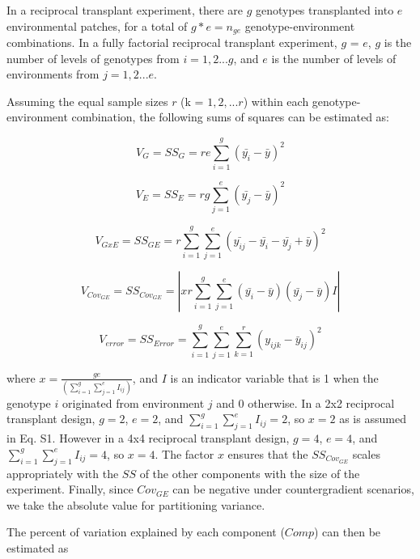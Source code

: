\documentclass[11pt, oneside]{amsart}
\begin{document}
In a reciprocal transplant experiment, there are $g$ genotypes transplanted into $e$ environmental patches, for a total of $g*e = n_{ge}$ genotype-environment combinations. In a fully factorial reciprocal transplant experiment, $g$ = $e$, $g$ is the number of levels of genotypes from $i = 1,2... g$, and $e$ is the number of levels of environments from $j = 1,2... e$.

Assuming the equal sample sizes $r$ (k = $1, 2, ...r$) within each genotype-environment combination, the following sums of squares can be estimated as:

\begin{equation}
V_G = SS_G = re\sum_{i=1}^g (\bar{y_i} - \bar{y})^2
\end{equation}

\begin{equation}
V_E = SS_E =  rg\sum_{j=1}^e (\bar{y_j} - \bar{y})^2 
\end{equation}

\begin{equation}
V_{GxE} = SS_{GE} = r \sum_{i=1}^g \sum_{j=1}^e (\bar{y_{ij}} - \bar{y_i} - \bar{y_j} + \bar{y})^2
\end{equation}

\begin{equation}
V_{Cov_{GE}}= SS_{Cov_{GE}} = | xr \sum_{i=1}^g\sum_{j=1}^e(\bar{y_i} - \bar{y})(\bar{y_j} - \bar{y})I |
\end{equation}

\begin{equation}
V_{error} = SS_{Error} = \sum_{i=1}^g \sum_{j=1}^e \sum_{k=1}^r (y_{ijk}-\bar{y}_{ij})^2
\end{equation}

where $x = \frac{ge}{(\sum_{i=1}^g\sum_{j=1}^e I_{ij})}$, and $I$ is an indicator variable that is 1 when the genotype $i$ originated from environment $j$ and 0 otherwise. In a 2x2 reciprocal transplant design, $g=2$, $e=2$, and $\sum_{i=1}^g\sum_{j=1}^e I_{ij}=2$, so $x = 2$ as is assumed in Eq. S1. However in a 4x4 reciprocal transplant design, $g=4$, $e=4$, and $\sum_{i=1}^g\sum_{j=1}^e I_{ij}=4$, so $x = 4$. The factor $x$ ensures that the $SS_{Cov_{GE}}$ scales appropriately with the $SS$ of the other components with the size of the experiment. Finally, since $Cov_{GE}$ can be negative under countergradient scenarios, we take the absolute value for partitioning variance.

The percent of variation explained by each component ($Comp$) can then be estimated as
\end{document}
